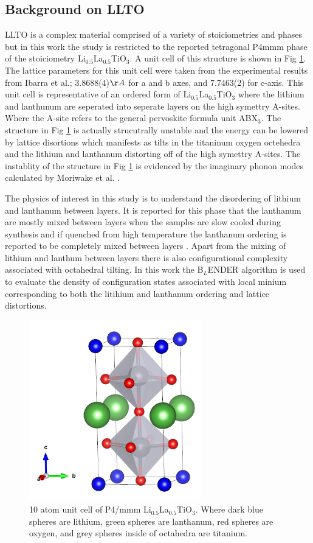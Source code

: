 \documentclass[aps,pre,reprint,superscriptaddress,showkeys]{revtex4-1}
\begin{document}
\subsection{Background on LLTO}
LLTO is a complex material comprised of a variety of stoiciometries and phases but in this work the study is restricted to the reported tetragonal P4mmm phase of the stoiciometry Li$_{0.5}$La$_{0.5}$TiO$_{3}$\cite{LLTOreview,P4mmmstrucuture}. A unit cell of this structure is shown in Fig \ref{LLTO_unit_cell}. The lattice parameters for this unit cell were taken from the experimental results from Ibarra et al.\cite{P4mmmstrucuture}; 3.8688(4)$\AA$ for a and b axes, and 7.7463(2) for c-axis.  This unit cell is representative of an ordered form of Li$_{0.5}$La$_{0.5}$TiO$_{3}$ where the lithium and lanthunum are seperated into seperate layers on the high symettry A-sites. Where the A-site refers to the general pervoskite formula unit ABX$_3$.  The structure in Fig \ref{LLTO_unit_cell} is actually strucutrally unstable and the energy can be lowered by lattice disortions which manifests as tilts in the titaninum oxygen octehedra and the lithium and lanthanum distorting off of the high symettry A-sites. The instablity of the structure in Fig \ref{LLTO_unit_cell} is evidenced by the imaginary phonon modes calculated by Moriwake et al. \cite{imaginary_phonons}.  

The physics of interest in this study is to understand the disordering of lithium and lanthanum between layers.  It is reported for this phase that the lanthanum are mostly mixed between layers when the samples are slow cooled during synthesis and if quenched from high temperature the lanthanum ordering is reported to be completely mixed between layers \cite{P4mmmstrucuture}. Apart from the mixing of lithium and lanthum between layers there is also configurational complexity associated with octahedral tilting. In this work the B$_L$ENDER algorithm is used to evaluate the density of configuration states associated with local minium corresponding to both the litihium and lanthanum ordering and lattice distortions.   
\begin{figure}[h!]
\includegraphics[width=7.5cm]{./figures/unit_cell_P4mmm_cropped.png}
\caption{10 atom unit cell of P4/mmm Li$_{0.5}$La$_{0.5}$TiO$_{3}$. Where dark blue spheres are lithium, green spheres are lanthanum, red spheres are oxygen, and grey spheres inside of octahedra are titanium.\label{LLTO_unit_cell}}
\end{figure}
\end{document}
